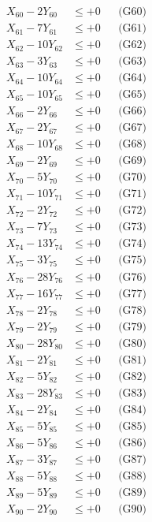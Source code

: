 \documentclass[a4paper,10pt]{article}
\begin{document}
{\begin{align}
X_{60} - 2Y_{60} &\leq +0 && \text{(G60)} \\
X_{61} - 7Y_{61} &\leq +0 && \text{(G61)} \\
X_{62} - 10Y_{62} &\leq +0 && \text{(G62)} \\
X_{63} - 3Y_{63} &\leq +0 && \text{(G63)} \\
X_{64} - 10Y_{64} &\leq +0 && \text{(G64)} \\
X_{65} - 10Y_{65} &\leq +0 && \text{(G65)} \\
X_{66} - 2Y_{66} &\leq +0 && \text{(G66)} \\
X_{67} - 2Y_{67} &\leq +0 && \text{(G67)} \\
X_{68} - 10Y_{68} &\leq +0 && \text{(G68)} \\
X_{69} - 2Y_{69} &\leq +0 && \text{(G69)} \\
\allowbreak
X_{70} - 5Y_{70} &\leq +0 && \text{(G70)} \\
X_{71} - 10Y_{71} &\leq +0 && \text{(G71)} \\
X_{72} - 2Y_{72} &\leq +0 && \text{(G72)} \\
X_{73} - 7Y_{73} &\leq +0 && \text{(G73)} \\
X_{74} - 13Y_{74} &\leq +0 && \text{(G74)} \\
X_{75} - 3Y_{75} &\leq +0 && \text{(G75)} \\
X_{76} - 28Y_{76} &\leq +0 && \text{(G76)} \\
X_{77} - 16Y_{77} &\leq +0 && \text{(G77)} \\
X_{78} - 2Y_{78} &\leq +0 && \text{(G78)} \\
X_{79} - 2Y_{79} &\leq +0 && \text{(G79)} \\
\allowbreak
X_{80} - 28Y_{80} &\leq +0 && \text{(G80)} \\
X_{81} - 2Y_{81} &\leq +0 && \text{(G81)} \\
X_{82} - 5Y_{82} &\leq +0 && \text{(G82)} \\
X_{83} - 28Y_{83} &\leq +0 && \text{(G83)} \\
X_{84} - 2Y_{84} &\leq +0 && \text{(G84)} \\
X_{85} - 5Y_{85} &\leq +0 && \text{(G85)} \\
X_{86} - 5Y_{86} &\leq +0 && \text{(G86)} \\
X_{87} - 3Y_{87} &\leq +0 && \text{(G87)} \\
X_{88} - 5Y_{88} &\leq +0 && \text{(G88)} \\
X_{89} - 5Y_{89} &\leq +0 && \text{(G89)} \\
\allowbreak
X_{90} - 2Y_{90} &\leq +0 && \text{(G90)} \\

\end{align}}
\end{document}
